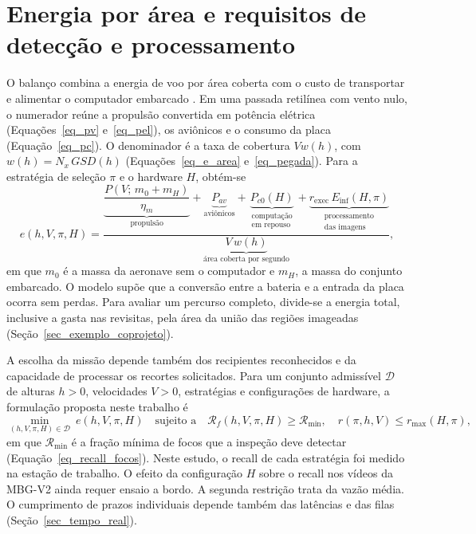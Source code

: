 \section{Energia por área e requisitos de detecção e processamento}
\label{sec_coprojeto}

O balanço combina a energia de voo por área coberta \cite{difranco2016coverage} com o custo de transportar e alimentar o computador embarcado \cite{boroujerdian2018mavbench}. Em uma passada retilínea com vento nulo, o numerador reúne a propulsão convertida em potência elétrica (Equações~\eqref{eq_pv} e~\eqref{eq_pel}), os aviônicos e o consumo da placa (Equação~\eqref{eq_pc}). O denominador é a taxa de cobertura $Vw(h)$, com $w(h)=N_x\,GSD(h)$ (Equações~\eqref{eq_e_area} e~\eqref{eq_pegada}). Para a estratégia de seleção $\pi$ e o hardware $H$, obtém-se
\begin{equation}
  e(h, V, \pi, H) =
  \frac{
    \underbrace{\dfrac{P\!\left(V;\, m_0 + m_H\right)}{\eta_m}}_{\text{propulsão}}
    + \underbrace{P_{av}}_{\text{aviônicos}}
    + \underbrace{P_{c0}(H)}_{\substack{\text{computação}\\\text{em repouso}}}
    + \underbrace{r_{\mathrm{exec}}\,E_{\mathrm{inf}}(H,\pi)}_{\substack{\text{processamento}\\\text{das imagens}}}
  }{\underbrace{V\, w(h)}_{\text{área coberta por segundo}}},
  \label{eq_coprojeto}
\end{equation}
em que $m_0$ é a massa da aeronave sem o computador e $m_H$, a massa do conjunto embarcado. O modelo supõe que a conversão entre a bateria e a entrada da placa ocorra sem perdas. Para avaliar um percurso completo, divide-se a energia total, inclusive a gasta nas revisitas, pela área da união das regiões imageadas (Seção~\ref{sec_exemplo_coprojeto}).

A escolha da missão depende também dos recipientes reconhecidos e da capacidade de processar os recortes solicitados. Para um conjunto admissível $\mathcal{D}$ de alturas $h>0$, velocidades $V>0$, estratégias e configurações de hardware, a formulação proposta neste trabalho é
\begin{equation}
  \min_{(h,V,\pi,H)\in\mathcal{D}}\ e(h, V, \pi, H)
  \quad \text{sujeito a} \quad
  \mathcal{R}_f(h, V, \pi,H) \geq \mathcal{R}_{\min},
  \quad r(\pi, h, V) \leq r_{\max}(H,\pi),
  \label{eq_otimizacao}
\end{equation}
em que $\mathcal{R}_{\min}$ é a fração mínima de focos que a inspeção deve detectar (Equação~\eqref{eq_recall_focos}). Neste estudo, o recall de cada estratégia foi medido na estação de trabalho. O efeito da configuração $H$ sobre o recall nos vídeos da MBG-V2 ainda requer ensaio a bordo. A segunda restrição trata da vazão média. O cumprimento de prazos individuais depende também das latências e das filas (Seção~\ref{sec_tempo_real}).

